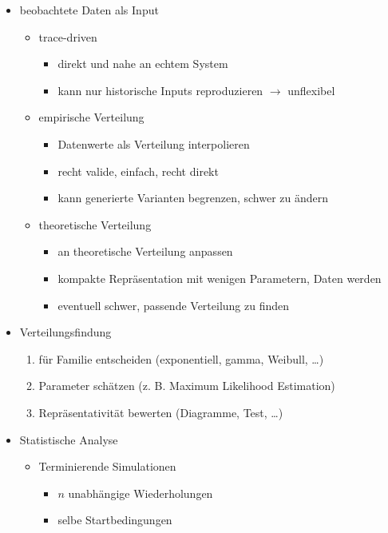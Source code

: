 \documentclass[nonacm=true, language=german]{acmart}
\begin{document}
\begin{itemize}
    \item beobachtete Daten als Input
    \begin{itemize}
        \item trace-driven
        \begin{itemize}
            \item direkt und nahe an echtem System
            \item kann nur historische Inputs reproduzieren $\rightarrow$ unflexibel
        \end{itemize}
        \item empirische Verteilung
        \begin{itemize}
            \item Datenwerte als Verteilung interpolieren
            \item recht valide, einfach, recht direkt
            \item kann generierte Varianten begrenzen, schwer zu ändern
        \end{itemize}
        \item theoretische Verteilung
        \begin{itemize}
            \item an theoretische Verteilung anpassen
            \item kompakte Repräsentation mit wenigen Parametern, Daten werden 
            \item eventuell schwer, passende Verteilung zu finden
        \end{itemize}
    \end{itemize}
    \item Verteilungsfindung
    \begin{enumerate}
        \item für Familie entscheiden (exponentiell, gamma, Weibull, \dots)
        \item Parameter schätzen (z. B. Maximum Likelihood Estimation)
        \item Repräsentativität bewerten (Diagramme, Test, \dots)
    \end{enumerate}
    \item Statistische Analyse
    \begin{itemize}
        \item Terminierende Simulationen
        \begin{itemize}
            \item $n$ unabhängige Wiederholungen
            \item selbe Startbedingungen

\end{itemize}
\end{itemize}
\end{itemize}
\end{document}
